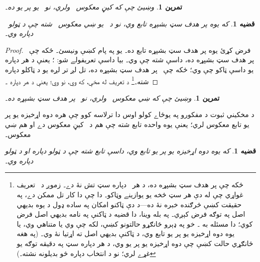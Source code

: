 \documentclass[12pt,a4paper,oneside]{report}
\newcommand{\Setabs}[2]{\{#1 : #2\}}
\newcommand{\Nat}{\mathbb{N}}
\newcommand{\ollabel}[1]{\label{\pspart:\pschapter:\pssection:#1}}
\newenvironment{explain}{}{}
\newtheorem{prop}[defn]{قضيه}
\newtheorem{prob}[defn]{تمرين}
\begin{document}
\begin{prob}
وښيئ چې که  کيڼ معکوس~ ولري، نو~
يو پر يو ده۔
\end{prob}

\begin{prop}
    که  يوه پر هدف سټ بشپړه تابع وي، نو د~
    يو \emph{ښي معکوس}~ شته چې د ټولو~
    دپاره  وي۔
\end{prop}

\begin{proof}
فرض کړئ  يوه پر هدف سټ بشپړه تابع ده۔ يو 
په پام کښې ونيسئ۔ ځکه چې~ پر هدف سټ بشپړه ده، داسې 
شته چې  وي۔ بيا داسې تعريفولے شو: ؛
يعنې د هر  دپاره يو داسې  ټاکو چې 
وي؛ ځکه چې~ پر هدف سټ بشپړه ده، تل لږ تر لږه يو د ټاکلو دپاره
شته۔\footnote{ځکه چې  پر هدف سټ بشپړه ده، د هر~
دپاره سټ \LR{$\Setabs{x}{f(x) = y}$} تش نۀ دے۔ زموږ د~ تعريف غواړي
چې له دې هر سټ څخه يو يوازينے  وټاکو۔ دا چې دا کار تل ممکن
دے، په حقيقت کښې څرګنده خبره نۀ ده---د دې ټاکنو امکان په ساده
ډول د يوه بديهي اصل په توګه فرض کېږي۔ په بله وينا، دا قضيه
د ټاکنې په نامه بديهي اصل فرض کوي؛ دا مسئله به
۔ خو په ډېرو ځانګړو حالتونو کښې، لکه
چې \LR{$A = \Nat$} وي يا متناهي وي، يا  يوه دوه اړخيزه يو پر يو تابع وي،
د ټاکنې بديهي اصل ته اړتيا نۀ وي۔ (په هغه ځانګړي حالت کښې چې
 دوه اړخيزه يو پر يو وي، د هر  دپاره سټ
\LR{$\Setabs{x}{f(x) = y}$} په دقيقه توګه يو غړے لري؛ نو د
انتخاب دپاره څو بديلونه نشته۔)}
د تعريف له مخې، که  وي، نو  وي؛ يعنې
د هر  دپاره ۔
\end{proof}

\begin{prob}
وښيئ چې که  ښي معکوس~ ولري، نو~
پر هدف سټ بشپړه ده۔
\end{prob}

\begin{explain}
  د مخکيني ثبوت د مفکورو په يوځاے کولو اوس دا ترلاسه کوو چې
  هره دوه اړخيزه يو پر يو تابع معکوس لري؛ يعنې يوه واحده تابع شته چې
  هم د~ کيڼ معکوس دے او هم ښي معکوس۔
\end{explain}

\begin{prop}\ollabel{prop:bijection-inverse}
که  يوه دوه اړخيزه يو پر يو تابع وي، داسې تابع
 شته چې د ټولو  دپاره
 او د ټولو  دپاره  وي۔
\end{prop}
\end{document}

